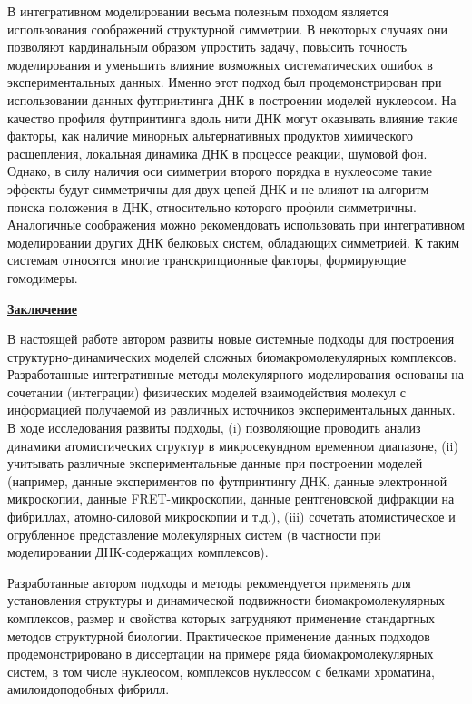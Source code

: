 В интегративном моделировании весьма полезным походом является использования соображений структурной симметрии. В некоторых случаях они позволяют кардинальным образом упростить задачу, повысить точность моделирования и уменьшить влияние возможных систематических ошибок в экспериментальных данных. Именно этот подход был продемонстрирован при использовании данных футпринтинга ДНК в построении моделей нуклеосом. На качество профиля футпринтинга вдоль нити ДНК могут оказывать влияние такие факторы, как наличие минорных альтернативных продуктов химического расщепления, локальная динамика ДНК в процессе реакции, шумовой фон. Однако, в силу наличия оси симметрии второго порядка в нуклеосоме такие эффекты будут симметричны для двух цепей ДНК и не влияют на алгоритм поиска положения в ДНК, относительно которого профили симметричны. Аналогичные соображения можно рекомендовать использовать при интегративном моделировании других ДНК белковых систем, обладающих симметрией. К таким системам относятся многие транскрипционные факторы, формирующие гомодимеры. 


\underline{\textbf{Заключение}}
\ifdefined\DISSER   \else {} \fi

В настоящей работе автором развиты новые системные подходы для построения структурно-динамических моделей сложных биомакромолекулярных комплексов. Разработанные интегративные методы молекулярного моделирования основаны на сочетании (интеграции) физических моделей взаимодействия молекул с информацией получаемой из различных источников экспериментальных данных. В ходе исследования развиты подходы, (i) позволяющие проводить анализ динамики атомистических структур в микросекундном временном диапазоне, (ii) учитывать различные экспериментальные данные при построении моделей (например, данные экспериментов по футпринтингу ДНК, данные электронной микроскопии, данные FRET-микроскопии, данные рентгеновской дифракции на фибриллах, атомно-силовой микроскопии и т.д.), (iii) сочетать атомистическое и огрубленное представление молекулярных систем (в частности при моделировании ДНК-содержащих комплексов).


Разработанные автором подходы и методы рекомендуется применять для установления структуры и динамической подвижности биомакромолекулярных комплексов, размер и свойства которых затрудняют применение стандартных методов структурной биологии. Практическое применение данных подходов продемонстрировано в диссертации на примере ряда биомакромолекулярных систем, в том числе нуклеосом, комплексов нуклеосом с белками хроматина, амилоидоподобных фибрилл.



